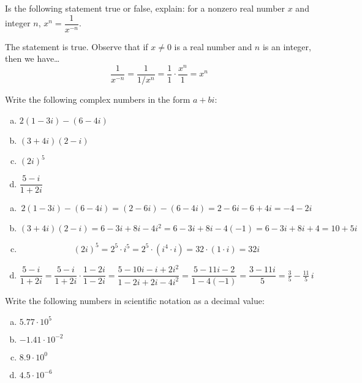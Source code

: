 \documentclass[11pt,letterpaper]{article}
\begin{document}

 Is the following statement true or false, explain: for a nonzero real number $x$ and integer $n$, $x^n= \dfrac{1}{x^{-n}}$. \pspace

\sol The statement is true. Observe that if $x \neq 0$ is a real number and $n$ is an integer, then we have\dots
	\[
	\dfrac{1}{x^{-n}}= \dfrac{1}{1/x^n}= \dfrac{1}{1} \cdot \dfrac{x^n}{1}= x^n
	\]



\newpage



 Write the following complex numbers in the form $a + bi$:
	\begin{enumerate}[(a)]
	\item $2(1 - 3i) - (6 - 4i)$
	\item $(3 + 4i)(2 - i)$
	\item $(2i)^5$
	\item $\dfrac{5 - i}{1 + 2i}$
	\end{enumerate} \pspace

\sol
\begin{enumerate}[(a)]
\item 
	\[
	2(1 - 3i) - (6 - 4i)= (2 - 6i) - (6 - 4i)= 2 - 6i - 6 + 4i= -4 - 2i
	\] \pspace

\item 
	\[
	(3 + 4i)(2 - i)= 6 - 3i + 8i - 4i^2= 6 - 3i + 8i - 4(-1)= 6 - 3i + 8i + 4= 10 + 5i
	\] \pspace

\item 
	\[
	(2i)^5= 2^5 \cdot i^5= 2^5 \cdot (i^4 \cdot i)= 32 \cdot (1 \cdot i)= 32i 
	\] \pspace

\item 
	\[
	\dfrac{5 - i}{1 + 2i}= \dfrac{5 - i}{1 + 2i} \cdot \dfrac{1 - 2i}{1 - 2i}= \dfrac{5 - 10i - i + 2i^2}{1 - 2i + 2i - 4i^2}= \dfrac{5 - 11i - 2}{1 - 4(-1)}= \dfrac{3 - 11i}{5}= \tfrac{3}{5} - \tfrac{11}{5}\, i
	\]
\end{enumerate}



\newpage



 Write the following numbers in scientific notation as a decimal value:
	\begin{enumerate}[(a)]
	\item $5.77 \cdot 10^5$
	\item $-1.41 \cdot 10^{-2}$
	\item $8.9 \cdot 10^0$
	\item $4.5 \cdot 10^{-6}$
	\end{enumerate} \pspace
\end{document}
